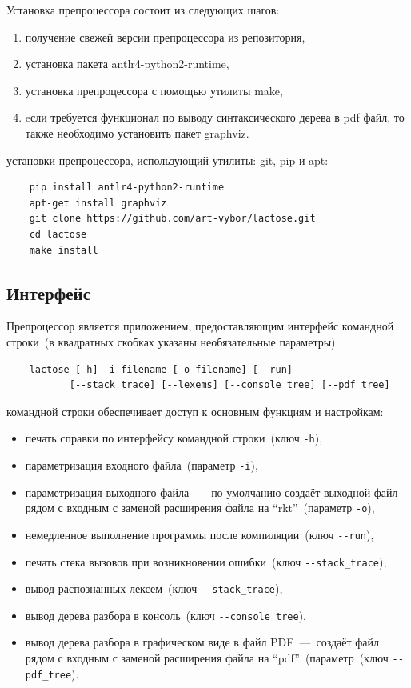 \documentclass[12pt,a4paper,oneside]{extarticle}
\begin{document}
        \noindent Установка препроцессора состоит из следующих шагов:
        \begin{enumerate}
                \item получение свежей версии препроцессора из репозитория,
                \item установка пакета antlr4-python2-runtime,
                \item установка препроцессора с помощью утилиты make,
                \item eсли требуется функционал по выводу синтаксического дерева в pdf файл, то также необходимо установить пакет graphviz.
        \end{enumerate}

         установки препроцессора, использующий утилиты: git, pip и apt:  
        \begin{lstlisting}
    pip install antlr4-python2-runtime
    apt-get install graphviz
    git clone https://github.com/art-vybor/lactose.git
    cd lactose
    make install
        \end{lstlisting}
    \clearpage
    
    \subsection{Интерфейс}
        Препроцессор является приложением, предоставляющим интерфейс командной строки~(в квадратных скобках указаны необязательные параметры):
        \begin{lstlisting}        
    lactose [-h] -i filename [-o filename] [--run]
           [--stack_trace] [--lexems] [--console_tree] [--pdf_tree]
        \end{lstlisting}

         командной строки обеспечивает доступ к основным функциям и настройкам:
        \begin{itemize}
                \item печать справки по интерфейсу командной строки~(ключ \lstinline$-h$),
                \item параметризация входного файла~(параметр \lstinline$-i$),
                \item параметризация выходного файла~---~по умолчанию создаёт выходной файл рядом с входным с заменой расширения файла на ``rkt''~(параметр \lstinline$-o$),
                \item немедленное выполнение программы после компиляции~(ключ \lstinline$--run$),
                \item печать стека вызовов при возникновении ошибки~(ключ \lstinline$--stack_trace$),
                \item вывод распознанных лексем~(ключ \lstinline$--stack_trace$),
                \item вывод дерева разбора в консоль~(ключ \lstinline$--console_tree$),
                \item вывод дерева разбора в графическом виде в файл PDF~---~создаёт файл рядом с входным с заменой расширения файла на ``pdf''~(параметр~(ключ \lstinline$--pdf_tree$).
        \end{itemize}
\end{document}

